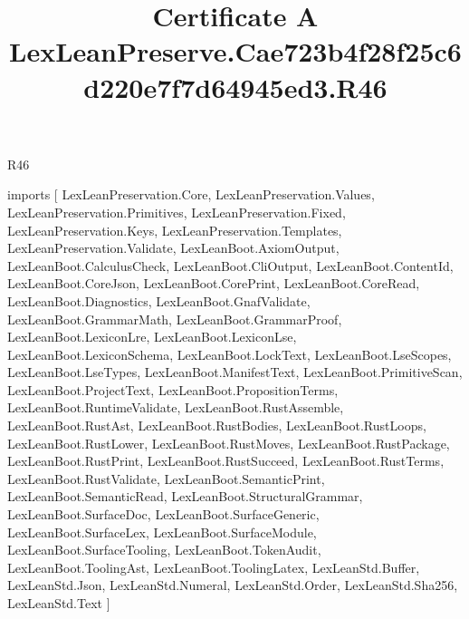 \begin{lexlean}{R46}
\title{Certificate A LexLeanPreserve.Cae723b4f28f25c6d220e7f7d64945ed3.R46}
\begin{coremodule}
imports [
  LexLeanPreservation.Core,
  LexLeanPreservation.Values,
  LexLeanPreservation.Primitives,
  LexLeanPreservation.Fixed,
  LexLeanPreservation.Keys,
  LexLeanPreservation.Templates,
  LexLeanPreservation.Validate,
  LexLeanBoot.AxiomOutput,
  LexLeanBoot.CalculusCheck,
  LexLeanBoot.CliOutput,
  LexLeanBoot.ContentId,
  LexLeanBoot.CoreJson,
  LexLeanBoot.CorePrint,
  LexLeanBoot.CoreRead,
  LexLeanBoot.Diagnostics,
  LexLeanBoot.GnafValidate,
  LexLeanBoot.GrammarMath,
  LexLeanBoot.GrammarProof,
  LexLeanBoot.LexiconLre,
  LexLeanBoot.LexiconLse,
  LexLeanBoot.LexiconSchema,
  LexLeanBoot.LockText,
  LexLeanBoot.LseScopes,
  LexLeanBoot.LseTypes,
  LexLeanBoot.ManifestText,
  LexLeanBoot.PrimitiveScan,
  LexLeanBoot.ProjectText,
  LexLeanBoot.PropositionTerms,
  LexLeanBoot.RuntimeValidate,
  LexLeanBoot.RustAssemble,
  LexLeanBoot.RustAst,
  LexLeanBoot.RustBodies,
  LexLeanBoot.RustLoops,
  LexLeanBoot.RustLower,
  LexLeanBoot.RustMoves,
  LexLeanBoot.RustPackage,
  LexLeanBoot.RustPrint,
  LexLeanBoot.RustSucceed,
  LexLeanBoot.RustTerms,
  LexLeanBoot.RustValidate,
  LexLeanBoot.SemanticPrint,
  LexLeanBoot.SemanticRead,
  LexLeanBoot.StructuralGrammar,
  LexLeanBoot.SurfaceDoc,
  LexLeanBoot.SurfaceGeneric,
  LexLeanBoot.SurfaceLex,
  LexLeanBoot.SurfaceModule,
  LexLeanBoot.SurfaceTooling,
  LexLeanBoot.TokenAudit,
  LexLeanBoot.ToolingAst,
  LexLeanBoot.ToolingLatex,
  LexLeanStd.Buffer,
  LexLeanStd.Json,
  LexLeanStd.Numeral,
  LexLeanStd.Order,
  LexLeanStd.Sha256,
  LexLeanStd.Text
]


\end{coremodule}
\end{lexlean}
